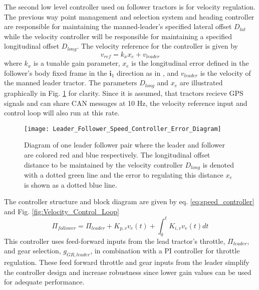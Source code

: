 The second low level controller used on follower tractors is for velocity regulation. The previous way point management and selection system and heading controller are responsible for maintaining the manned-leader's specified lateral offset $D_{lat}$ while the velocity controller will be responsible for maintaining a specified longitudinal offset $D_{long}$. The velocity reference for the controller is given by 
\begin{equation}\label{eq:velocity_reference}
        v_{ref} = k_x x_e + v_{leader}
\end{equation}
where $k_x$ is a tunable gain parameter, $x_e$ is the longitudinal error defined in the follower's body fixed frame in the $\mathbf{i}_1$ direction as in \cite{low2015flexible,low2014flexible}, and $v_{leader}$ is the velocity of the manned leader tractor. The parameters $D_{long}$ and $x_{e}$ are illustrated graphically in Fig. \ref{fig:Leader_Follower_Speed_Controller_Error_Diagram} for clarity. Since it is assumed, that tractors recieve GPS signals and can share CAN messages at 10 Hz, the velocity reference input and control loop will also run at this rate.
\begin{figure}[hb]
    \centering
    \texttt{[image: Leader\_Follower\_Speed\_Controller\_Error\_Diagram]}
    \caption{Diagram of one leader follower pair where the leader and follower are colored red and blue respectively. The longitudinal offset distance to be maintained by the velocity controller $D_{long}$ is denoted with a dotted green line and the error to regulating this distance $x_e$ is shown as a dotted blue line.}
    \label{fig:Leader_Follower_Speed_Controller_Error_Diagram}
\end{figure}
The controller structure and block diagram are given by eq. \ref{eq:speed_controller} and Fig. \ref{fig:Velocity_Control_Loop}
\begin{equation}\label{eq:speed_controller}
    \Pi_{follower} = \Pi_{leader} + K_{p,v}v_e(t) + \int_{0}^{t}K_{i,v}v_e(t)dt
\end{equation}
This controller uses feed-forward inputs from the lead tractor's throttle, $\Pi_{leader}$, and gear selection, $g_{GR,leader}$, in combination with a PI controller for throttle regulation. These feed forward throttle and gear inputs from the leader simplify the controller design and increase robustness since lower gain values can be used for adequate performance. 

